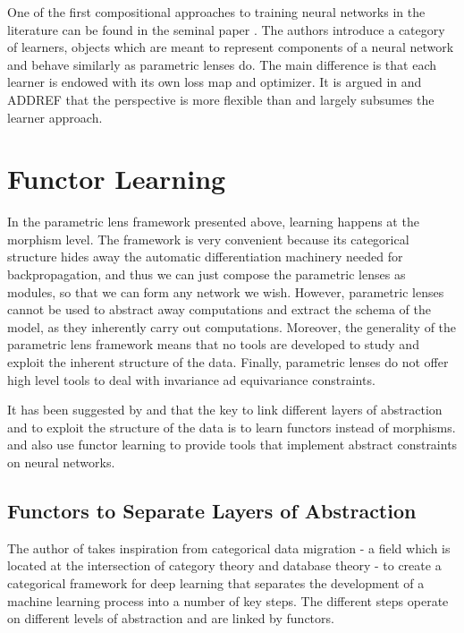 \documentclass[11pt,a4paper,openright,twoside]{report}
\theoremstyle{plain}
\theoremstyle{definition}
\begin{document}
One of the first compositional approaches to training neural networks in the literature can be found in the seminal paper \cite{fongBackpropFunctorCompositional2019a}. The authors introduce a category of learners, objects which are meant to represent components of a neural network and behave similarly as parametric lenses do. The main difference is that each learner is endowed with its own loss map and optimizer. It is argued in \cite{cruttwellDeepLearningParametric} and ADDREF that the perspective \cite{cruttwellDeepLearningParametric} is more flexible than and largely subsumes the learner approach. 


\section{Functor Learning}

In the parametric lens framework presented above, learning happens at the morphism level. The framework is very convenient because its categorical structure hides away the automatic differentiation machinery needed for backpropagation, and thus we can just compose the parametric lenses as modules, so that we can form any network we wish. However, parametric lenses cannot be used to abstract away computations and extract the schema of the model, as they inherently carry out computations. Moreover, the generality of the parametric lens framework means that no tools are developed to study and exploit the inherent structure of the data. Finally, parametric lenses do not offer high level tools to deal with invariance ad equivariance constraints. 

It has been suggested by \cite{gavranovicLearningFunctorsUsing2020} and \cite{sheshmaniCategoricalRepresentationLearning2022} that the key to link different layers of abstraction and to exploit the structure of the data is to learn functors instead of morphisms. \cite{gavranovicLearningFunctorsUsing2020} and \cite{vaswaniAttentionAllYou2023} also use functor learning to provide tools that implement abstract constraints on neural networks.



\subsection{Functors to Separate Layers of Abstraction}

The author of \cite{gavranovicLearningFunctorsUsing2020} takes inspiration from categorical data migration - a field which is located at the intersection of category theory and database theory - to create a categorical framework for deep learning that separates the development of a machine learning process into a number of key steps. The different steps operate on different levels of abstraction and are linked by functors.
\end{document}
